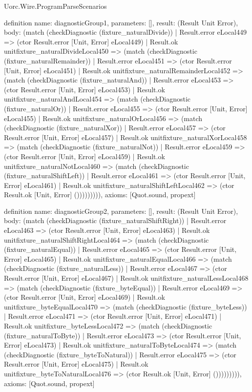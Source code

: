 \begin{lexlean}{Uorc.Wire.ProgramParseScenarios}
\begin{semanticmodule}
definition{
  name: diagnosticGroup1,
  parameters: [],
  result: (Result Unit Error),
  body: (match (checkDiagnostic (fixture_naturalDivide))
    | Result.error eLocal449 => (ctor Result.error [Unit, Error] eLocal449)
    | Result.ok unitfixture_naturalDivideLocal450 => (match (checkDiagnostic (fixture_naturalRemainder))
      | Result.error eLocal451 => (ctor Result.error [Unit, Error] eLocal451)
      | Result.ok unitfixture_naturalRemainderLocal452 => (match (checkDiagnostic (fixture_naturalAnd))
        | Result.error eLocal453 => (ctor Result.error [Unit, Error] eLocal453)
        | Result.ok unitfixture_naturalAndLocal454 => (match (checkDiagnostic (fixture_naturalOr))
          | Result.error eLocal455 => (ctor Result.error [Unit, Error] eLocal455)
          | Result.ok unitfixture_naturalOrLocal456 => (match (checkDiagnostic (fixture_naturalXor))
            | Result.error eLocal457 => (ctor Result.error [Unit, Error] eLocal457)
            | Result.ok unitfixture_naturalXorLocal458 => (match (checkDiagnostic (fixture_naturalNot))
              | Result.error eLocal459 => (ctor Result.error [Unit, Error] eLocal459)
              | Result.ok unitfixture_naturalNotLocal460 => (match (checkDiagnostic (fixture_naturalShiftLeft))
                | Result.error eLocal461 => (ctor Result.error [Unit, Error] eLocal461)
                | Result.ok unitfixture_naturalShiftLeftLocal462 => (ctor Result.ok [Unit, Error] ())))))))),
  axioms: [Quot.sound, propext]
}

definition{
  name: diagnosticGroup2,
  parameters: [],
  result: (Result Unit Error),
  body: (match (checkDiagnostic (fixture_naturalShiftRight))
    | Result.error eLocal463 => (ctor Result.error [Unit, Error] eLocal463)
    | Result.ok unitfixture_naturalShiftRightLocal464 => (match (checkDiagnostic (fixture_naturalEqual))
      | Result.error eLocal465 => (ctor Result.error [Unit, Error] eLocal465)
      | Result.ok unitfixture_naturalEqualLocal466 => (match (checkDiagnostic (fixture_naturalLess))
        | Result.error eLocal467 => (ctor Result.error [Unit, Error] eLocal467)
        | Result.ok unitfixture_naturalLessLocal468 => (match (checkDiagnostic (fixture_byteEqual))
          | Result.error eLocal469 => (ctor Result.error [Unit, Error] eLocal469)
          | Result.ok unitfixture_byteEqualLocal470 => (match (checkDiagnostic (fixture_byteLess))
            | Result.error eLocal471 => (ctor Result.error [Unit, Error] eLocal471)
            | Result.ok unitfixture_byteLessLocal472 => (match (checkDiagnostic (fixture_naturalToByte))
              | Result.error eLocal473 => (ctor Result.error [Unit, Error] eLocal473)
              | Result.ok unitfixture_naturalToByteLocal474 => (match (checkDiagnostic (fixture_byteToNatural))
                | Result.error eLocal475 => (ctor Result.error [Unit, Error] eLocal475)
                | Result.ok unitfixture_byteToNaturalLocal476 => (ctor Result.ok [Unit, Error] ())))))))),
  axioms: [Quot.sound, propext]
}


\end{semanticmodule}
\end{lexlean}
